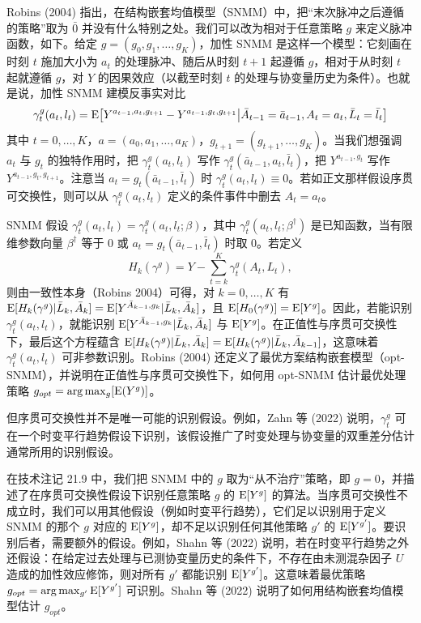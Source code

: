 \begin{techpoint}[一般结构嵌套均值模型的形式定义]
Robins (2004) 指出，在结构嵌套均值模型（SNMM）中，把“末次脉冲之后遵循的策略”取为 $\bar 0$ 并没有什么特别之处。我们可以改为相对于任意策略 $g$ 来定义脉冲函数，如下。给定 $g=(g_0,g_1,\dots,g_K)$，加性 SNMM 是这样一个模型：它刻画在时刻 $t$ 施加大小为 $a_t$ 的处理脉冲、随后从时刻 $t+1$ 起遵循 $g$，相对于从时刻 $t$ 起就遵循 $g$，对 $Y$ 的因果效应（以截至时刻 $t$ 的处理与协变量历史为条件）。也就是说，加性 SNMM 建模反事实对比
\[
\gamma^g_t(a_t,l_t)=\mathrm{E}\big[Y^{a_{t-1},a_t,g_{t+1}}-Y^{a_{t-1},g_t,g_{t+1}}\big|\bar A_{t-1}=\bar a_{t-1},A_t=a_t,\bar L_t=\bar l_t\big]
\]
其中 $t=0,\dots,K$，$a=(a_0,a_1,\dots,a_K)$，$g_{t+1}=(g_{t+1},\dots,g_K)$。当我们想强调 $a_t$ 与 $g_t$ 的独特作用时，把 $\gamma^g_t(a_t,l_t)$ 写作 $\gamma^g_t(\bar a_{t-1},a_t,\bar l_t)$，把 $Y^{a_{t-1},g_t}$ 写作 $Y^{a_{t-1},g_t,g_{t+1}}$。注意当 $a_t=g_t(\bar a_{t-1},\bar l_t)$ 时 $\gamma^g_t(a_t,l_t)\equiv0$。若如正文那样假设序贯可交换性，则可以从 $\gamma^g_t(a_t,l_t)$ 定义的条件事件中删去 $A_t=a_t$。

SNMM 假设 $\gamma^g_t(a_t,l_t)=\gamma^g_t(a_t,l_t;\beta)$，其中 $\gamma^g_t(a_t,l_t;\beta^\dagger)$ 是已知函数，当有限维参数向量 $\beta^\dagger$ 等于 0 或 $a_t=g_t(\bar a_{t-1},\bar l_t)$ 时取 0。若定义
\[
H_k(\gamma^g)=Y-\sum_{t=k}^{K}\gamma^g_t(A_t,L_t),
\]
则由一致性本身（Robins 2004）可得，对 $k=0,\dots,K$ 有 $\mathrm{E}[H_k(\gamma^g)|\bar L_k,\bar A_k]=\mathrm{E}[Y^{\bar A_{k-1},g_k}|\bar L_k,\bar A_k]$，且 $\mathrm{E}[H_0(\gamma^g)]=\mathrm{E}[Y^g]$。因此，若能识别 $\gamma^g_t(a_t,l_t)$，就能识别 $\mathrm{E}[Y^{\bar A_{k-1},g_k}|\bar L_k,\bar A_k]$ 与 $\mathrm{E}[Y^g]$。在正值性与序贯可交换性下，最后这个方程蕴含 $\mathrm{E}[H_k(\gamma^g)|\bar L_k,\bar A_k]=\mathrm{E}[H_k(\gamma^g)|\bar L_k,\bar A_{k-1}]$，这意味着 $\gamma^g_t(a_t,l_t)$ 可非参数识别。Robins (2004) 还定义了最优方案结构嵌套模型（opt-SNMM），并说明在正值性与序贯可交换性下，如何用 opt-SNMM 估计最优处理策略 $g_{opt}=\arg\max_g[\mathrm{E}(Y^g)]$。

但序贯可交换性并不是唯一可能的识别假设。例如，Zahn 等 (2022) 说明，$\gamma^g_t$ 可在一个时变平行趋势假设下识别，该假设推广了时变处理与协变量的双重差分估计通常所用的识别假设。

在技术注记 21.9 中，我们把 SNMM 中的 $g$ 取为“从不治疗”策略，即 $g=0$，并描述了在序贯可交换性假设下识别任意策略 $g$ 的 $\mathrm{E}[Y^g]$ 的算法。当序贯可交换性不成立时，我们可以用其他假设（例如时变平行趋势），它们足以识别用于定义 SNMM 的那个 $g$ 对应的 $\mathrm{E}[Y^g]$，却不足以识别任何其他策略 $g'$ 的 $\mathrm{E}[Y^{g'}]$。要识别后者，需要额外的假设。例如，Shahn 等 (2022) 说明，若在时变平行趋势之外还假设：在给定过去处理与已测协变量历史的条件下，不存在由未测混杂因子 $U$ 造成的加性效应修饰，则对所有 $g'$ 都能识别 $\mathrm{E}[Y^{g'}]$。这意味着最优策略 $g_{opt}=\arg\max_{g'}\mathrm{E}[Y^{g'}]$ 可识别。Shahn 等 (2022) 说明了如何用结构嵌套均值模型估计 $g_{opt}$。
\end{techpoint}
